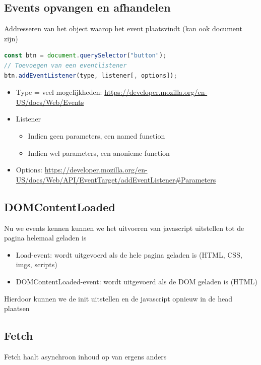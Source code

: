 \documentclass{article}
\begin{document}
\subsection{Events opvangen en afhandelen}
Addresseren van het object waarop het event plaatsvindt (kan ook document zijn)


\begin{lstlisting}[language=Javascript]
const btn = document.querySelector("button");
// Toevoegen van een eventlistener
btn.addEventListener(type, listener[, options]);
\end{lstlisting}

\begin{itemize}
    \item Type = veel mogelijkheden: \url{https://developer.mozilla.org/en-US/docs/Web/Events}
    \item Listener
    \begin{itemize}
        \item Indien geen parameters, een named function
        \item Indien wel parameters, een anonieme function
    \end{itemize}
    \item Options: \url{https://developer.mozilla.org/en-US/docs/Web/API/EventTarget/addEventListener#Parameters}
\end{itemize}

\subsection{DOMContentLoaded}
Nu we events kennen kunnen we het uitvoeren van javascript uitstellen tot de pagina helemaal geladen is
\begin{itemize}
    \item Load-event: wordt uitgevoerd als de hele pagina geladen is (HTML, CSS, imgs, scripts)
    \item DOMContentLoaded-event: wordt uitgevoerd als de DOM geladen is (HTML)
\end{itemize}
Hierdoor kunnen we de init uitstellen en de javascript opnieuw in de head plaatsen

\subsection{Fetch}
Fetch haalt asynchroon inhoud op van ergens anders
\end{document}
